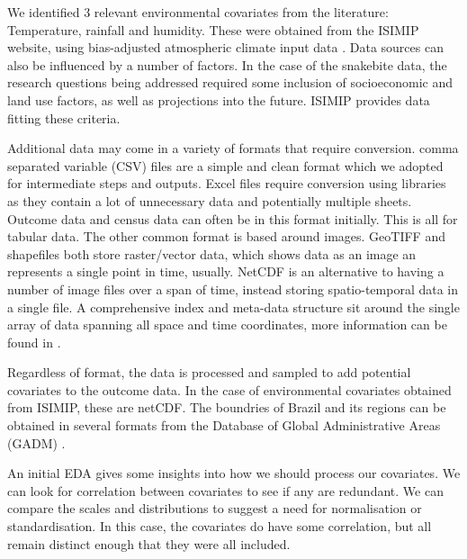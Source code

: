 \documentclass{article}
\begin{document}

We identified 3 relevant environmental covariates from the literature: Temperature, rainfall and humidity. These were obtained from the ISIMIP website, using bias-adjusted atmospheric climate input data \cite{10.48364/ISIMIP.208515}. Data sources can also be influenced by a number of factors. In the case of the snakebite data, the research questions being addressed required some inclusion of socioeconomic and land use factors, as well as projections into the future. ISIMIP provides data fitting these criteria.

Additional data may come in a variety of formats that require conversion. comma separated variable (CSV) files are a simple and clean format which we adopted for intermediate steps and outputs. Excel files require conversion using libraries as they contain a lot of unnecessary data and potentially multiple sheets. Outcome data and census data can often be in this format initially. This is all for tabular data. The other common format is based around images. GeoTIFF and shapefiles both store raster/vector data, which shows data as an image an represents a single point in time, usually. NetCDF is an alternative to having a number of image files over a span of time, instead storing spatio-temporal data in a single file. A comprehensive index and meta-data structure sit around the single array of data spanning all space and time coordinates, more information can be found in \cite{singhEfficientNetCDFProcessing}.

Regardless of format, the data is processed and sampled to add potential covariates to the outcome data. In the case of environmental covariates obtained from ISIMIP, these are netCDF. The boundries of Brazil and its regions can be obtained in several formats from the Database of Global Administrative Areas (GADM) \cite{gadmDatabaseGlobalAdministrative}.

An initial EDA gives some insights into how we should process our covariates. We can look for correlation between covariates to see if any are redundant. We can compare the scales and distributions to suggest a need for normalisation or standardisation. In this case, the covariates do have some correlation, but all remain distinct enough that they were all included. %
\end{document}
